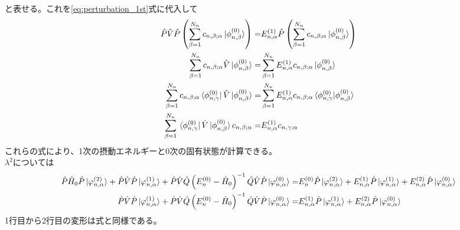 \documentclass{ltjsarticle}
\begin{document}
と表せる。これを\eqref{eq:perturbation_1st}式に代入して
\begin{align}
  \hat{P}\hat{V}\hat{P}\left( \sum_{\beta=1}^{N_n}c_{n,\beta;\alpha}\ket*{\phi^{(0)}_{n,\beta}} \right) =&E^{(1)}_{n,\alpha}\hat{P}\left( \sum_{\beta=1}^{N_n}c_{n,\beta;\alpha}\ket*{\phi^{(0)}_{n,\beta}} \right) \\
  \sum_{\beta=1}^{N_n}c_{n,\beta;\alpha}\hat{V}\ket*{\phi^{(0)}_{n,\beta}} =&\sum_{\beta=1}^{N_n}E^{(1)}_{n,\alpha}c_{n,\beta;\alpha}\ket*{\phi^{(0)}_{n,\beta}}\\
  \sum_{\beta=1}^{N_n}c_{n,\beta;\alpha}\bra*{\phi^{(0)}_{n,\gamma}}\hat{V}\ket*{\phi^{(0)}_{n,\beta}} =&\sum_{\beta=1}^{N_n}E^{(1)}_{n,\alpha}c_{n,\beta;\alpha}\bra*{\phi^{(0)}_{n,\gamma}}\ket*{\phi^{(0)}_{n,\beta}}\\
  \sum_{\beta=1}^{N_n}\bra*{\phi^{(0)}_{n,\gamma}}\hat{V}\ket*{\phi^{(0)}_{n,\beta}}c_{n,\beta;\alpha}=&E^{(1)}_{n,\alpha}c_{n,\gamma;\alpha}\\
\end{align}
これらの式により、1次の摂動エネルギーと0次の固有状態が計算できる。\\
$\lambda^2$については
\begin{align}
  \hat{P}\hat{H}_0\hat{P}\ket*{\varphi^{(2)}_{n,\alpha}}+\hat{P}\hat{V}\hat{P}\ket*{\varphi^{(1)}_{n,\alpha}}+\hat{P}\hat{V}\hat{Q}\left( E_n^{(0)}-\hat{H}_0 \right)^{-1}\hat{Q}\hat{V}\hat{P}\ket*{\varphi^{(0)}_{n,\alpha}}=&E_n^{(0)}\hat{P}\ket*{\varphi^{(2)}_{n,\alpha}}+E^{(1)}_{n,\alpha}\hat{P}\ket*{\varphi^{(1)}_{n,\alpha}}+E^{(2)}_{n,\alpha}\hat{P}\ket*{\varphi^{(0)}_{n,\alpha}}\\
  \hat{P}\hat{V}\hat{P}\ket*{\varphi^{(1)}_{n,\alpha}}+\hat{P}\hat{V}\hat{Q}\left( E_n^{(0)}-\hat{H}_0 \right)^{-1}\hat{Q}\hat{V}\hat{P}\ket*{\varphi^{(0)}_{n,\alpha}}=&E^{(1)}_{n,\alpha}\hat{P}\ket*{\varphi^{(1)}_{n,\alpha}}+E^{(2)}_{n,\alpha}\hat{P}\ket*{\varphi^{(0)}_{n,\alpha}}\\
  \label{eq:perturbation_2nd}
\end{align}
1行目から2行目の変形は\label{eq:perturbation_1st}式と同様である。\\
\end{document}
